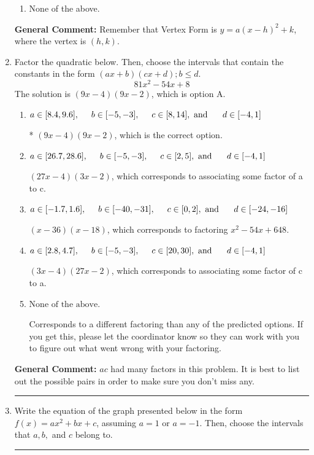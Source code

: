 \documentclass{extbook}[14pt]
\newcommand{\litem}[1]{\item #1

\rule{\textwidth}{0.4pt}}
\begin{document}
\begin{enumerate}
{\begin{enumerate}[label=\Alph*.]
\begin{multicols}{2}
\end{multicols}\item None of the above.\end{enumerate}
\textbf{General Comment:} Remember that Vertex Form is $y = a(x-h)^2+k$, where the vertex is $(h, k)$.
}
\litem{
Factor the quadratic below. Then, choose the intervals that contain the constants in the form $(ax+b)(cx+d); b \leq d.$
\[ 81x^{2} -54 x + 8 \]The solution is \( (9x -4)(9x -2) \), which is option A.\begin{enumerate}[label=\Alph*.]
\item \( a \in [8.4, 9.6], \hspace*{5mm} b \in [-5, -3], \hspace*{5mm} c \in [8, 14], \text{ and } \hspace*{5mm} d \in [-4, 1] \)

* $(9x -4)(9x -2)$, which is the correct option.
\item \( a \in [26.7, 28.6], \hspace*{5mm} b \in [-5, -3], \hspace*{5mm} c \in [2, 5], \text{ and } \hspace*{5mm} d \in [-4, 1] \)

 $(27x -4)(3x -2)$, which corresponds to associating some factor of a to c.
\item \( a \in [-1.7, 1.6], \hspace*{5mm} b \in [-40, -31], \hspace*{5mm} c \in [0, 2], \text{ and } \hspace*{5mm} d \in [-24, -16] \)

 $(x -36)(x -18)$, which corresponds to factoring $x^{2} -54 x + 648$.
\item \( a \in [2.8, 4.7], \hspace*{5mm} b \in [-5, -3], \hspace*{5mm} c \in [20, 30], \text{ and } \hspace*{5mm} d \in [-4, 1] \)

 $(3x -4)(27x -2)$, which corresponds to associating some factor of c to a.
\item \( \text{None of the above.} \)

 Corresponds to a different factoring than any of the predicted options. If you get this, please let the coordinator know so they can work with you to figure out what went wrong with your factoring.
\end{enumerate}

\textbf{General Comment:} $ac$ had many factors in this problem. It is best to list out the possible pairs in order to make sure you don't miss any.
}
\litem{
Write the equation of the graph presented below in the form $f(x)=ax^2+bx+c$, assuming  $a=1$ or $a=-1$. Then, choose the intervals that $a, b,$ and $c$ belong to.

}
\end{enumerate}
\end{document}

